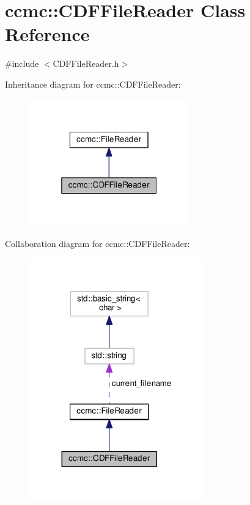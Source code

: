 \hypertarget{classccmc_1_1_c_d_f_file_reader}{\section{ccmc\-:\-:C\-D\-F\-File\-Reader Class Reference}
\label{classccmc_1_1_c_d_f_file_reader}
}


{\ttfamily \#include $<$C\-D\-F\-File\-Reader.\-h$>$}



Inheritance diagram for ccmc\-:\-:C\-D\-F\-File\-Reader\-:
\nopagebreak
\begin{figure}[H]
\begin{center}
\leavevmode
\includegraphics[width=196pt]{classccmc_1_1_c_d_f_file_reader__inherit__graph}
\end{center}
\end{figure}


Collaboration diagram for ccmc\-:\-:C\-D\-F\-File\-Reader\-:
\nopagebreak
\begin{figure}[H]
\begin{center}
\leavevmode
\includegraphics[width=215pt]{classccmc_1_1_c_d_f_file_reader__coll__graph}
\end{center}
\end{figure}
